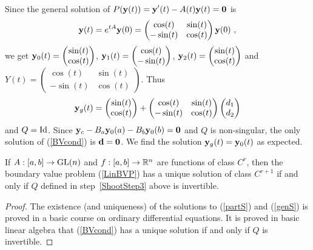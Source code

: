\begin{egg}
Since the general solution of
$\displaystyle P(\mathbf{y}(t)) = \mathbf{y}'(t) - A(t) \mathbf{y}(t) = \mathbf{0}$ is
\[
\mathbf{y}(t) = e^{tA} \mathbf{y}(0) =
\begin{pmatrix} \cos(t) & \sin(t) \\ -\sin(t) & \cos(t) \end{pmatrix}
\mathbf{y}(0) \ ,
\]
we get
$\displaystyle \mathbf{y}_0(t) =
\begin{pmatrix} \sin(t) \\ \cos(t) \end{pmatrix}$,
$\displaystyle \mathbf{y}_1(t) =
\begin{pmatrix} \cos(t) \\ -\sin(t) \end{pmatrix}$,
$\displaystyle \mathbf{y}_2(t) =
\begin{pmatrix} \sin(t) \\ \cos(t) \end{pmatrix}$ and
$\displaystyle Y(t) = \begin{pmatrix}
\cos(t) & \sin(t) \\  -\sin(t) & \cos(t) \end{pmatrix}$.  Thus
\[
\mathbf{y}_g(t) =
\begin{pmatrix} \sin(t) \\ \cos(t) \end{pmatrix}
+ \begin{pmatrix} \cos(t) & \sin(t) \\ -\sin(t) & \cos(t) \end{pmatrix}
\begin{pmatrix} d_1 \\ d_2 \end{pmatrix}
\]
and $\displaystyle Q = \operatorname{Id}$.  Since
$\displaystyle \mathbf{y}_c - B_a\mathbf{y}_0(a) - B_b\mathbf{y}_0(b) = \mathbf{0}$
and $Q$ is non-singular, the only solution of
(\ref{BVcond}) is $\mathbf{d} = \mathbf{0}$.  We find the solution
$\mathbf{y}_g(t) = \mathbf{y}_0(t)$ as expected.
\end{egg}

\begin{theorem}
If $A:[a,b]\to \mathrm{GL}(n)$ and $f:[a,b]\to \mathbb{R}^n$ are functions of
class $C^r$, then the boundary value problem (\ref{LinBVP}) has a unique
solution of class $C^{r+1}$ if and only if $Q$ defined in
step~\ref{ShootStep3} above is invertible.  \label{BVPCdiff}
\end{theorem}

\begin{proof}
The existence (and uniqueness) of the solutions to
(\ref{partS}) and (\ref{genS}) is proved in a basic course on ordinary
differential equations.  It is proved in basic linear algebra that
(\ref{BVcond}) has a unique solution if and only if $Q$ is invertible.
\end{proof}

